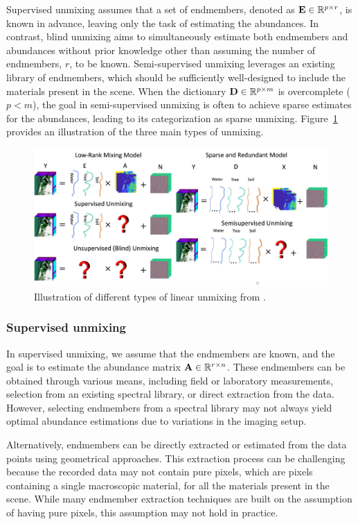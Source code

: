 Supervised unmixing assumes that a set of endmembers, denoted as $\mathbf E \in \mathbb R^{p \times r}$, is known in advance, leaving only the task of estimating the abundances.
In contrast, blind unmixing aims to simultaneously estimate both endmembers and abundances without prior knowledge other than assuming the number of endmembers, $r$, to be known.
Semi-supervised unmixing leverages an existing library of endmembers, which should be sufficiently well-designed to include the materials present in the scene.
When the dictionary $\mathbf D \in \mathbb R^{p \times m}$ is overcomplete ($p < m$), the goal in semi-supervised unmixing is often to achieve sparse estimates for the abundances, leading to its categorization as sparse unmixing.
Figure~\ref{fig:scenarios} provides an illustration of the three main types of unmixing.


\begin{figure}[h]
	\centering
	\includegraphics[width=\textwidth]{Models_LR_Sparse.pdf}
	\caption{Illustration of different types of linear unmixing from \cite{rasti_image_2023}.}
	\label{fig:scenarios}
\end{figure}

\subsubsection{Supervised unmixing}

In supervised unmixing, we assume that the endmembers are known, and the goal is to estimate the abundance matrix $\mathbf A \in \mathbb R^{r \times n}$.
These endmembers can be obtained through various means, including field or laboratory measurements, selection from an existing spectral library, or direct extraction from the data.
However, selecting endmembers from a spectral library may not always yield optimal abundance estimations due to variations in the imaging setup.

Alternatively, endmembers can be directly extracted or estimated from the data points using geometrical approaches.
This extraction process can be challenging because the recorded data may not contain pure pixels, which are pixels containing a single macroscopic material, for all the materials present in the scene.
While many endmember extraction techniques are built on the assumption of having pure pixels, this assumption may not hold in practice.

